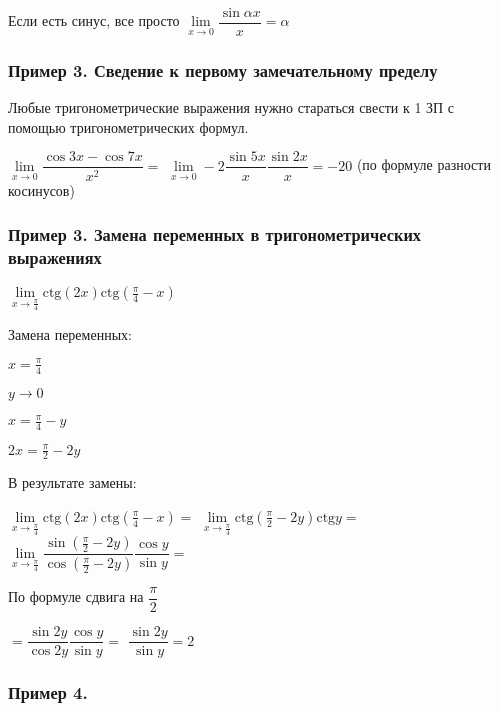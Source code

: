 Если есть синус, все просто
$ \lim\limits_{x\to 0} \dfrac{ \sin{\alpha x} }{x} = \alpha $

\subsubsection{Пример 3. Сведение к первому замечательному пределу}

Любые тригонометрические выражения нужно стараться свести к
1 ЗП с помощью тригонометрических формул.

$ \lim\limits_{x\to 0} \dfrac{ \cos{3x} - \cos{7x}}{x^{2}} = $
$ \lim\limits_{x\to 0} -2 \dfrac{\sin{5x}}{x} \dfrac{\sin{2x}}{x} = -20 $
(по формуле разности косинусов)

\subsubsection{Пример 3. Замена переменных в тригонометрических выражениях}

$ \lim\limits_{x\to \frac{\pi}{4} } \mathrm{ctg}(2x)  \mathrm{ctg}( \frac{\pi}{4} - x)  $

Замена переменных:

$ x = \frac{\pi}{4} $

$ y \to 0 $

$ x = \frac{\pi}{4} - y $

$ 2x = \frac{\pi}{2} - 2y $

В результате замены:

$ \lim\limits_{x\to \frac{\pi}{4} } \mathrm{ctg}(2x)  \mathrm{ctg}( \frac{\pi}{4} - x) = $
$ \lim\limits_{x\to \frac{\pi}{4} } \mathrm{ctg}(\frac{\pi}{2} - 2y)  \mathrm{ctg}{y} = $
$ \lim\limits_{x\to \frac{\pi}{4} } 
\dfrac{\sin(\frac{\pi}{2} - 2y)}{\cos(\frac{\pi}{2} - 2y)}
\dfrac{\cos{y} }{\sin{y} } = $

По формуле сдвига на $ \dfrac{\pi}{2} $ 

$ = \dfrac{\sin{2y} }{\cos{2y} } \dfrac{\cos{y} }{\sin{y} } = $
$ \dfrac{\sin{2y} }{\sin{y} } = 2 $

\subsubsection{Пример 4. }